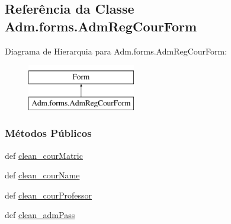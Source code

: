 \hypertarget{classAdm_1_1forms_1_1AdmRegCourForm}{\subsection{Referência da Classe Adm.\-forms.\-Adm\-Reg\-Cour\-Form}
\label{classAdm_1_1forms_1_1AdmRegCourForm}
}
Diagrama de Hierarquia para Adm.\-forms.\-Adm\-Reg\-Cour\-Form\-:\begin{figure}[H]
\begin{center}
\leavevmode
\includegraphics[height=2.000000cm]{df/d14/classAdm_1_1forms_1_1AdmRegCourForm}
\end{center}
\end{figure}
\subsubsection*{Métodos Públicos}
\begin{DoxyCompactItemize}
\item 
def \hyperlink{classAdm_1_1forms_1_1AdmRegCourForm_a9f46a4ae30627a99585378bb8cf7931f}{clean\-\_\-cour\-Matric}
\item 
def \hyperlink{classAdm_1_1forms_1_1AdmRegCourForm_a44ddd3e1d929aeb8f8ba24392ff913db}{clean\-\_\-cour\-Name}
\item 
def \hyperlink{classAdm_1_1forms_1_1AdmRegCourForm_ad8ef9f5e19392d2f1d3688ca0db794e2}{clean\-\_\-cour\-Professor}
\item 
def \hyperlink{classAdm_1_1forms_1_1AdmRegCourForm_a1f95b0682cc26239d83ce85a524bed8a}{clean\-\_\-adm\-Pass}
\end{DoxyCompactItemize}

